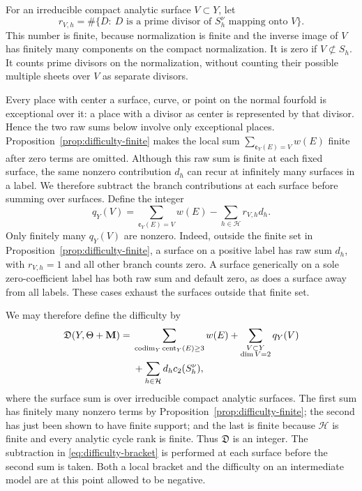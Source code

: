 For an irreducible compact analytic surface \(V\subset Y\), let
\begin{equation}\label{eq:difficulty-branches}
 r_{V,h}=\#\{D:\ D\text{ is a prime divisor of }S_h^\nu
                         \text{ mapping onto }V\}.
\end{equation}
This number is finite, because normalization is finite and the inverse
image of \(V\) has finitely many components on the compact normalization.
It is zero if \(V\not\subset S_h\).  It counts prime divisors on the
normalization, without counting their possible multiple sheets over \(V\)
as separate divisors.

Every place with center a surface, curve, or point on the normal fourfold
is exceptional over it: a place with a divisor as center is represented by
that divisor.  Hence the two raw sums below involve only exceptional
places.  Proposition~\ref{prop:difficulty-finite} makes the local sum
\(\sum_{\cent_Y(E)=V}w(E)\) finite after zero terms are omitted.  Although
this raw sum is finite at each fixed surface, the same nonzero contribution
\(d_h\) can recur at infinitely many surfaces in a label.  We therefore
subtract the branch contributions at each surface before summing over
surfaces.  Define the integer
\begin{equation}\label{eq:difficulty-bracket}
 q_Y(V)=\sum_{\cent_Y(E)=V}w(E)-\sum_{h\in\mathcal H}r_{V,h}d_h.
\end{equation}
Only finitely many \(q_Y(V)\) are nonzero.  Indeed, outside the finite set
in Proposition~\ref{prop:difficulty-finite}, a surface on a positive label
has raw sum \(d_h\), with \(r_{V,h}=1\) and all other branch counts zero.
A surface generically on a sole zero-coefficient label has both raw sum and
default zero, as does a surface away from all labels.  These cases exhaust
the surfaces outside that finite set.

We may therefore define the difficulty by
\begin{equation}\label{eq:difficulty}
 \begin{aligned}
 \mathfrak D(Y,\Theta+\mathbf{M})
 ={}&\sum_{\operatorname{codim}_Y\operatorname{cent}_Y(E)\geq3}w(E)
   +\sum_{\substack{V\subset Y\\\dim V=2}}q_Y(V)\\
 &+\sum_{h\in\mathcal H}d_hc_2(S_h^\nu),
 \end{aligned}
\end{equation}
where the surface sum is over irreducible compact analytic surfaces.
The first sum has finitely many nonzero terms by
Proposition~\ref{prop:difficulty-finite}; the second has just been shown
to have finite support; and the last is finite because \(\mathcal H\) is
finite and every analytic cycle rank is finite.  Thus \(\mathfrak D\) is
an integer.  The subtraction in \eqref{eq:difficulty-bracket} is performed
at each surface before the second sum is taken.  Both a local bracket and
the difficulty on an intermediate model are at this point allowed to be
negative.

